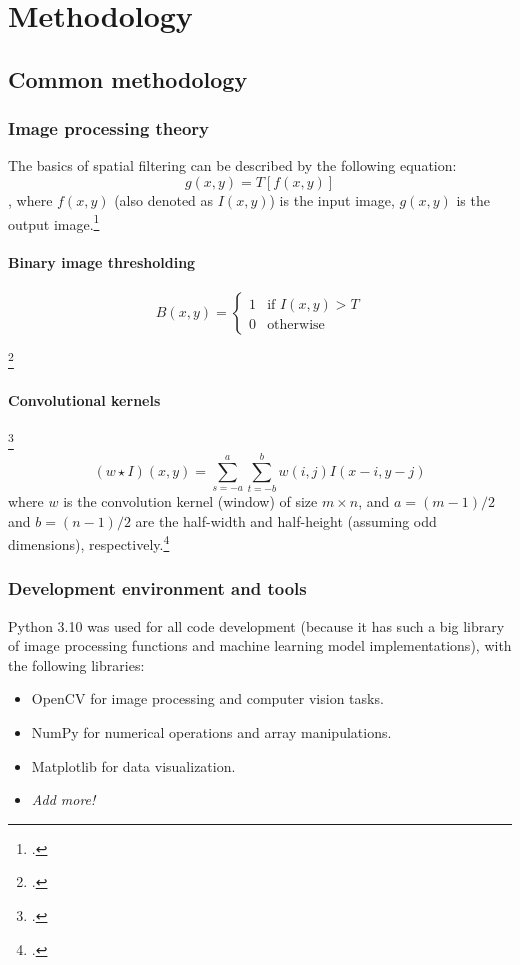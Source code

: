 \chapter{Methodology}
\section{Common methodology}


\subsection{Image processing theory}


The basics of spatial filtering can be described by the following equation:
$$ g(x,y) = T[f(x,y)] $$
, where $f(x,y)$ (also denoted as $I(x,y)$) is the input image, $g(x,y)$ is the output image.\footcite[p.~120]{DigitalImageProcessing}

\subsubsection{Binary image thresholding}
$$ B(x,y) = \begin{cases}
    1 & \text{if } I(x,y) > T \\
    0 & \text{otherwise} \end{cases} $$ 

\footcite[p.~743]{DigitalImageProcessing}


\subsubsection{Convolutional kernels}

\footcite[p.~159]{DigitalImageProcessing}
$$ (w \star I)(x,y) = \sum_{s=-a}^{a} \sum_{t=-b}^{b} w(i,j) I(x-i, y-j) $$
where $w$ is the convolution kernel (window) of size $m \times n$, and $a=(m-1)/2$ and $b=(n-1)/2$ are the half-width and half-height (assuming odd dimensions), respectively.\footcite[p.~157]{DigitalImageProcessing}





\subsection{Development environment and tools}

Python 3.10 was used for all code development (because it has such a big library of image processing functions and machine learning model implementations), with the following libraries:
\begin{itemize}
    \item OpenCV for image processing and computer vision tasks.
    \item NumPy for numerical operations and array manipulations.
    \item Matplotlib for data visualization.
    \item \textit{Add more!}
\end{itemize}

